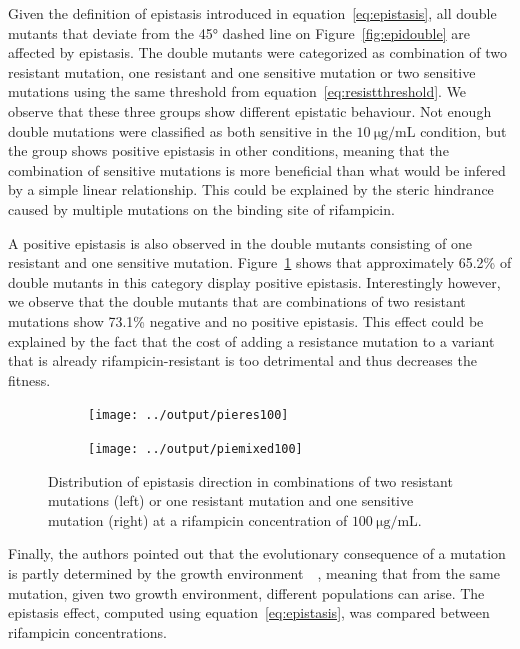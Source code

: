 \documentclass[12pt]{article}
\begin{document}
  Given the definition of epistasis introduced in
  equation~\eqref{eq:epistasis}, all double mutants that deviate from the
  45\si{\degree} dashed line on Figure~\ref{fig:epidouble} are affected by
  epistasis. The double mutants were categorized as combination of two
  resistant mutation, one resistant and one sensitive mutation or two sensitive
  mutations using the same threshold from equation~\eqref{eq:resistthreshold}.
  We observe that these three groups show different epistatic behaviour. Not
  enough double mutations were classified as both sensitive in the
  $\SI{10}{\micro\gram\per\milli\liter}$ condition, but the group shows
  positive epistasis in other conditions, meaning that the combination of
  sensitive mutations is more beneficial than what would be infered by a simple
  linear relationship. This could be explained by the steric hindrance caused
  by multiple mutations on the binding site of rifampicin.

  A positive epistasis is also observed in the double mutants consisting of one
  resistant and one sensitive mutation. Figure~\ref{fig:epidirection} shows
  that approximately 65.2\% of double mutants in this category display positive
  epistasis. Interestingly however, we observe that the double mutants that are
  combinations of two resistant mutations show 73.1\% negative and no positive
  epistasis. This effect could be explained by the fact that the cost of adding
  a resistance mutation to a variant that is already rifampicin-resistant is
  too detrimental and thus decreases the fitness.

  \begin{figure}[ht]
    \begin{subfigure}{.5\textwidth}
      \centering
      \texttt{[image: ../output/pieres100]}
    \end{subfigure}
    \begin{subfigure}{.5\textwidth}
      \centering
      \texttt{[image: ../output/piemixed100]}
    \end{subfigure}
    \caption{Distribution of epistasis direction in combinations of two
    resistant mutations (left) or one resistant mutation and one sensitive
    mutation (right) at a rifampicin concentration of
    $\SI{100}{\micro\gram\per\milli\liter}$.}%
    \label{fig:epidirection}
  \end{figure}

  Finally, the authors pointed out that the evolutionary consequence of a
  mutation is partly determined by the growth
  environment~\cite{remold2004}~\cite{weinreich2005}, meaning that from the
  same mutation, given two growth environment, different populations can arise.
  The epistasis effect, computed using equation~\eqref{eq:epistasis}, was
  compared between rifampicin concentrations.
\end{document}

